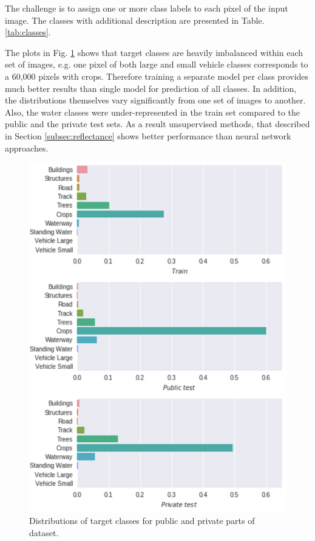 \documentclass[10pt,twocolumn,letterpaper]{article}
\begin{document}
The challenge is to assign one or more class labels to each pixel of the input image. The classes with additional description are presented in Table. \ref{tab:classes}. 

The plots in Fig. \ref{fig:cls_distr} shows that target classes are heavily imbalanced within each set of images, e.g. one pixel of both large and small vehicle classes corresponds to a 60,000 pixels with crops. Therefore training a separate model per class provides much better results than single model for prediction of all classes. In addition, the distributions themselves vary significantly from one set of images to another. Also, the water classes were under-represented in the train set compared to the public and the private test sets. As a result unsupervised methods, that described in Section \ref{subsec:reflectance} shows better performance than neural network approaches. 

\begin{figure}[!h]
	\captionsetup{justification=centering}
	\centering
	\includegraphics[scale=0.4]{class_distrib}
	\caption{ Distributions of target classes for public and private parts of dataset.}
	\label{fig:cls_distr}
\end{figure}
\end{document}

